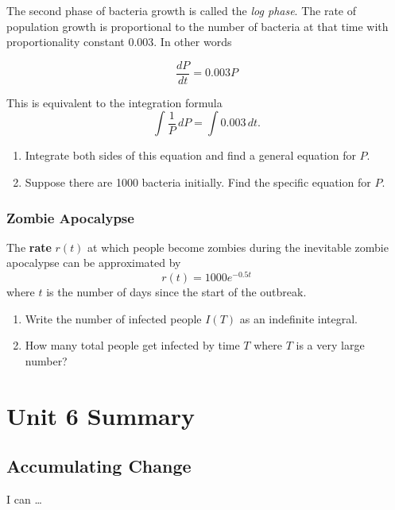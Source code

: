 \documentclass[
]{book}
\providecommand{\tightlist}{%
  \setlength{\itemsep}{0pt}\setlength{\parskip}{0pt}}
\begin{document}
The second phase of bacteria growth is called the \emph{log phase}. The rate of population growth is proportional to the number of bacteria at that time with proportionality constant 0.003. In other words

\[
\frac{dP}{dt} = 0.003 P
\]

This is equivalent to the integration formula
\[
\int \frac{1}{P} \, dP = \int 0.003 \, dt.
\]

\begin{enumerate}
\def\labelenumi{\arabic{enumi}.}
\tightlist
\item
  Integrate both sides of this equation and find a general equation for \(P\).
\item
  Suppose there are 1000 bacteria initially. Find the specific equation for \(P\).
\end{enumerate}

\hypertarget{zombie-apocalypse}{%
\subsection{Zombie Apocalypse}\label{zombie-apocalypse}}

The \textbf{rate} \(r(t)\) at which people become zombies during the inevitable zombie apocalypse can be approximated by
\[ r(t)=1000 e^{-0.5t}\]
where \(t\) is the number of days since the start of the outbreak.

\begin{enumerate}
\def\labelenumi{\arabic{enumi}.}
\tightlist
\item
  Write the number of infected people \(I(T)\) as an indefinite integral.
\item
  How many total people get infected by time \(T\) where \(T\) is a very large number?
\end{enumerate}

\hypertarget{unit-6-summary}{%
\chapter{Unit 6 Summary}\label{unit-6-summary}}

\hypertarget{accumulating-change-1}{%
\section{Accumulating Change}\label{accumulating-change-1}}

I can \ldots{}
\end{document}
